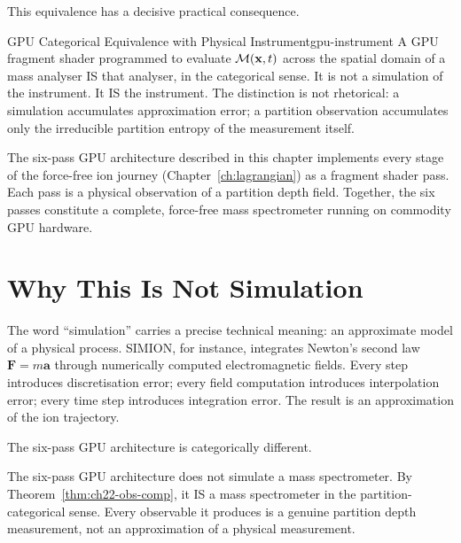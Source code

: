 This equivalence has a decisive practical consequence.

\begin{consequence}{GPU Categorical Equivalence with Physical Instrument}{gpu-instrument}
  A GPU fragment shader programmed to evaluate $\mathcal{M}(\mathbf{x},t)$ across
  the spatial domain of a mass analyser IS that analyser, in the categorical
  sense.  It is not a simulation of the instrument.  It IS the instrument.
  The distinction is not rhetorical: a simulation accumulates approximation
  error; a partition observation accumulates only the irreducible partition
  entropy of the measurement itself.
\end{consequence}

The six-pass GPU architecture described in this chapter implements every stage
of the force-free ion journey (Chapter~\ref{ch:lagrangian}) as a fragment
shader pass.  Each pass is a physical observation of a partition depth field.
Together, the six passes constitute a complete, force-free mass spectrometer
running on commodity GPU hardware.

\section{Why This Is Not Simulation}
\label{sec:ch22-not-simulation}

The word ``simulation'' carries a precise technical meaning: an approximate
model of a physical process.  SIMION, for instance, integrates Newton's second
law $\mathbf{F} = m\mathbf{a}$ through numerically computed electromagnetic
fields.  Every step introduces discretisation error; every field computation
introduces interpolation error; every time step introduces integration error.
The result is an approximation of the ion trajectory.

The six-pass GPU architecture is categorically different.

\begin{theorem}
\label{thm:ch22-not-sim}
  The six-pass GPU architecture does not simulate a mass spectrometer.  By
  Theorem~\ref{thm:ch22-obs-comp}, it IS a mass spectrometer in the partition-
  categorical sense.  Every observable it produces is a genuine partition depth
  measurement, not an approximation of a physical measurement.
\end{theorem}

